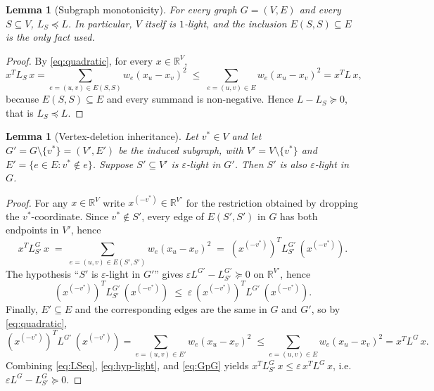 \documentclass[12pt]{article}
\newtheorem{lemma}[theorem]{Lemma}
\theoremstyle{definition}
\begin{document}
\begin{lemma}[Subgraph monotonicity]\label{lem:sub-mono}
For every graph $G=(V,E)$ and every $S\subseteq V$, $L_S \preceq L$.  In particular, $V$ itself is $1$-light, and the inclusion $E(S,S)\subseteq E$ is the only fact used.
\end{lemma}

\begin{proof}
By \eqref{eq:quadratic}, for every $x\in\mathbb{R}^V$,
\[
x^T L_S\,x = \sum_{e=(u,v)\in E(S,S)} w_e (x_u-x_v)^2 \;\le\; \sum_{e=(u,v)\in E} w_e (x_u-x_v)^2 = x^T L\,x,
\]
because $E(S,S)\subseteq E$ and every summand is non-negative.  Hence $L - L_S\succeq 0$, that is $L_S\preceq L$.
\end{proof}

\begin{lemma}[Vertex-deletion inheritance]\label{lem:inherit}
Let $v^*\in V$ and let $G' = G\setminus\{v^*\} = (V', E')$ be the induced subgraph, with $V'=V\setminus\{v^*\}$ and $E'=\{e\in E: v^*\notin e\}$.  Suppose $S'\subseteq V'$ is $\varepsilon$-light in $G'$.  Then $S'$ is also $\varepsilon$-light in $G$.
\end{lemma}

\begin{proof}
For any $x\in\mathbb{R}^V$ write $x^{(-v^*)}\in\mathbb{R}^{V'}$ for the restriction obtained by dropping the $v^*$-coordinate.  Since $v^*\notin S'$, every edge of $E(S',S')$ in $G$ has both endpoints in $V'$, hence
\begin{equation}\label{eq:LSeq}
x^T L_{S'}^{G}\,x \;=\; \sum_{e=(u,v)\in E(S',S')} w_e (x_u-x_v)^2 \;=\; (x^{(-v^*)})^T L_{S'}^{G'}\,(x^{(-v^*)}).
\end{equation}
The hypothesis ``$S'$ is $\varepsilon$-light in $G'$'' gives $\varepsilon L^{G'} - L_{S'}^{G'}\succeq 0$ on $\mathbb{R}^{V'}$, hence
\begin{equation}\label{eq:hyp-light}
(x^{(-v^*)})^T L_{S'}^{G'}\,(x^{(-v^*)}) \;\le\; \varepsilon\,(x^{(-v^*)})^T L^{G'}\,(x^{(-v^*)}).
\end{equation}
Finally, $E'\subseteq E$ and the corresponding edges are the same in $G$ and $G'$, so by \eqref{eq:quadratic},
\begin{equation}\label{eq:GpG}
(x^{(-v^*)})^T L^{G'}\,(x^{(-v^*)}) = \!\!\sum_{e=(u,v)\in E'}\!\! w_e (x_u-x_v)^2 \;\le\!\! \sum_{e=(u,v)\in E}\!\! w_e (x_u-x_v)^2 = x^T L^{G}\,x.
\end{equation}
Combining \eqref{eq:LSeq}, \eqref{eq:hyp-light}, and \eqref{eq:GpG} yields
$x^T L_{S'}^{G}\,x \le \varepsilon\, x^T L^{G}\,x$, i.e.\ $\varepsilon L^G - L_{S'}^G\succeq 0$.
\end{proof}
\end{document}
